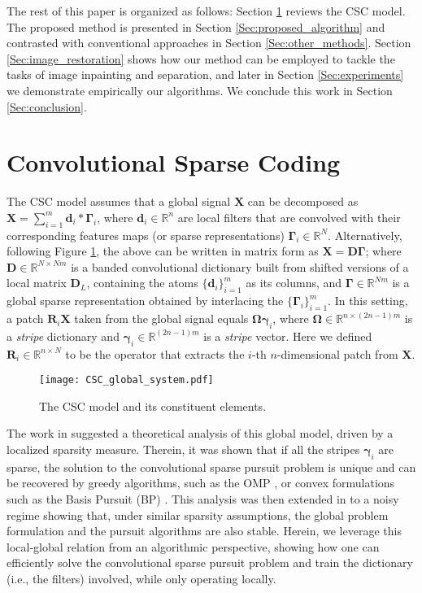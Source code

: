 \documentclass[10pt,twocolumn,letterpaper]{article}
\def\X{{\mathbf X}}
\def\dd{{\mathbf d}}
\def\D{{\mathbf D}}
\def\R{{\mathbf R}}
\def\gama{{\boldsymbol \gamma}}
\def\Gama{{\boldsymbol \Gamma}}
\def\Om{{\boldsymbol \Omega}}
\begin{document}
The rest of this paper is organized as follows: Section \ref{Sec:CSC} reviews the CSC model. The proposed method is presented in Section \ref{Sec:proposed_algorithm} and contrasted with conventional approaches in Section \ref{Sec:other_methods}. Section \ref{Sec:image_restoration} shows how our method can be employed to tackle the tasks of image inpainting and separation, and later in Section \ref{Sec:experiments} we demonstrate empirically our algorithms. We conclude this work in Section \ref{Sec:conclusion}.

\section{Convolutional Sparse Coding} \label{Sec:CSC}
The CSC model assumes that a global signal $\X$ can be decomposed as $\X = \sum_{i=1}^m \dd_i \ast \Gama_i$, where $\dd_i \in \mathbb{R}^n$ are local filters that are convolved with their corresponding features maps (or sparse representations) $\Gama_i \in \mathbb{R}^N$. Alternatively, following Figure \ref{Fig:CSC_global_system}, the above can be written in matrix form as $\X = \D \Gama$; where $\D \in \mathbb{R}^{N\times Nm}$ is a banded convolutional dictionary built from shifted versions of a local matrix $\D_L$, containing the atoms $\{ \dd_i \}_{i=1}^m$ as its columns, and $\Gama \in \mathbb{R}^{Nm}$ is a global sparse representation obtained by interlacing the $\{ \Gama_i \}_{i=1}^m$. In this setting, a patch $\R_i \X$ taken from the global signal equals $\Om \gama_i$, where $\Om \in \mathbb{R}^{n \times (2n-1)m}$ is a \textit{stripe} dictionary and $\gama_i \in \mathbb{R}^{(2n-1)m}$ is a \textit{stripe} vector. Here we defined $\R_i \in \mathbb{R}^{n \times N}$ to be the operator that extracts the $i$-th $n$-dimensional patch from $\X$.

\begin{figure}[t!]
	\centering
	\texttt{[image: CSC\_global\_system.pdf]}
	\caption{The CSC model and its constituent elements.}
	\label{Fig:CSC_global_system}
\end{figure}

The work in \cite{Papyan2016_1} suggested a theoretical analysis of this global model, driven by a localized sparsity measure. Therein, it was shown that if all the stripes $\gama_i$ are sparse, the solution to the convolutional sparse pursuit problem is unique and can be recovered by greedy algorithms, such as the OMP \cite{Chen1989}, or convex formulations such as the Basis Pursuit (BP) \cite{Chen2001}. This analysis was then extended in \cite{Papyan2016_2} to a noisy regime showing that, under similar sparsity assumptions, the global problem formulation and the pursuit algorithms are also stable. Herein, we leverage this local-global relation from an algorithmic perspective, showing how one can efficiently solve the convolutional sparse pursuit problem and train the dictionary (i.e., the filters) involved, while only operating locally.
\end{document}
